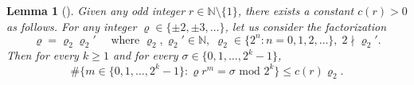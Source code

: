 \documentclass[12pt, twoside]{article}
\newtheorem{lemma}[theorem]{Lemma}
\theoremstyle{definition}
\numberwithin{equation}{section}
\begin{document}
\begin{lemma}[{\cite[Lemma 5A, $s=2$]{s60}}]  \label{digit-lemma-2} 
Given any odd integer $r \in \mathbb N \setminus \{1\}$, there exists a constant $c(r) > 0$ as follows. 
\vskip0.1in
\noindent For any integer $\varrho \in \{\pm 2, \pm 3, \ldots \}$, let us consider the factorization 
\begin{equation} 
\varrho = \varrho_2 \varrho_2' \quad \text{ where } \varrho_2, \varrho_2' \in \mathbb N, \; \varrho_2 \in \bigl\{2^n: n = 0, 1, 2, \ldots \bigr\}, \; 2 \nmid \varrho_2'. 
\end{equation} 
Then for every $k \geq 1$ and for every $\sigma \in \{0, 1, \ldots, 2^k-1 \}$, 
\begin{equation}  \label{digit-lemma-2-ineq} 
\# \bigl\{m \in \{0, 1, \ldots, 2^k-1\} : \varrho r^m = \sigma \text{ mod } 2^k \bigr\} \leq c(r) \varrho_2.  
\end{equation}  
\end{lemma} 
\end{document}
